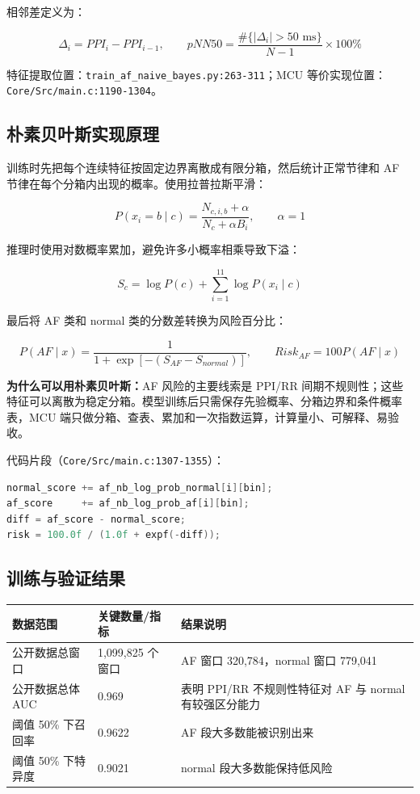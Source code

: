 \documentclass[10.5pt,a4paper,UTF8]{ctexart}
\newcommand{\keybox}[2]{
  \vspace{0.4em}
  \noindent
  \colorbox{#1}{%
    \parbox{\dimexpr\linewidth-2\fboxsep\relax}{#2}%
  }
  \vspace{0.4em}
}
\begin{document}
相邻差定义为：

\[
\Delta_i=PPI_i-PPI_{i-1},\qquad
pNN50=\frac{\#\{|\Delta_i|>50\text{ ms}\}}{N-1}\times100\%
\]

特征提取位置：\texttt{train\_af\_naive\_bayes.py:263-311}；MCU 等价实现位置：\texttt{Core/Src/main.c:1190-1304}。

\subsection{朴素贝叶斯实现原理}

训练时先把每个连续特征按固定边界离散成有限分箱，然后统计正常节律和 AF 节律在每个分箱内出现的概率。使用拉普拉斯平滑：

\[
P(x_i=b\mid c)=\frac{N_{c,i,b}+\alpha}{N_c+\alpha B_i},\qquad \alpha=1
\]

推理时使用对数概率累加，避免许多小概率相乘导致下溢：

\[
S_c=\log P(c)+\sum_{i=1}^{11}\log P(x_i\mid c)
\]

最后将 AF 类和 normal 类的分数差转换为风险百分比：

\[
P(AF\mid x)=\frac{1}{1+\exp[-(S_{AF}-S_{normal})]},\qquad
Risk_{AF}=100P(AF\mid x)
\]

\keybox{softgreen}{
\textbf{为什么可以用朴素贝叶斯：}AF 风险的主要线索是 PPI/RR 间期不规则性；这些特征可以离散为稳定分箱。模型训练后只需保存先验概率、分箱边界和条件概率表，MCU 端只做分箱、查表、累加和一次指数运算，计算量小、可解释、易验收。
}

代码片段（\texttt{Core/Src/main.c:1307-1355}）：

\begin{lstlisting}[language=C]
normal_score += af_nb_log_prob_normal[i][bin];
af_score     += af_nb_log_prob_af[i][bin];
diff = af_score - normal_score;
risk = 100.0f / (1.0f + expf(-diff));
\end{lstlisting}

\subsection{训练与验证结果}

\begin{longtable}{@{}L{4.7cm}L{3.6cm}L{5.3cm}@{}}
\toprule
数据范围 & 关键数量/指标 & 结果说明 \\
\midrule
公开数据总窗口 & 1,099,825 个窗口 & AF 窗口 320,784，normal 窗口 779,041 \\
公开数据总体 AUC & 0.969 & 表明 PPI/RR 不规则性特征对 AF 与 normal 有较强区分能力 \\
阈值 50\% 下召回率 & 0.9622 & AF 段大多数能被识别出来 \\
阈值 50\% 下特异度 & 0.9021 & normal 段大多数能保持低风险 \\
\bottomrule
\end{longtable}
\end{document}
